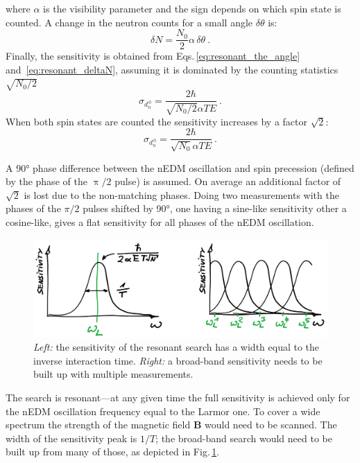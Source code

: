 where $\alpha$ is the visibility parameter and the sign depends on which spin state is counted.
A change in the neutron counts for a small angle $\delta \theta$ is:
\begin{equation}
  \delta N = \frac{N_0}{2} \alpha \, \delta \theta \ .
  \label{eq:resonant_deltaN}
\end{equation}
Finally, the sensitivity is obtained from Eqs.\,\ref{eq:resonant_the_angle} and~\ref{eq:resonant_deltaN}, assuming it is dominated by the counting statistics $\sqrt{N_0/2}$
\begin{equation}
  \sigma_{d_n^{\,0}} = \frac{2 \hbar}{\sqrt{N_0/2} \alpha T E} \ .
\end{equation}
When both spin states are counted the sensitivity increases by a factor $\sqrt{2}$:
\begin{equation}
  \sigma_{d_n^{\,0}} = \frac{2 \hbar}{\sqrt{N_0} \alpha T E} \ .
\end{equation}

A \ang{90} phase difference between the nEDM oscillation and spin precession (defined by the phase of the $\uppi/2$ pulse) is assumed.
On average an additional factor of $\sqrt{2}$ is lost due to the non-matching phases.
Doing two measurements with the phases of the $\pi/2$ pulses shifted by \ang{90}, one having a sine-like sensitivity other a cosine-like, gives a flat sensitivity for all phases of the nEDM oscillation.

\begin{figure}
  \centering
  \includegraphics[width=\linewidth]{gfx/axions/resonant_sensitivity.png}
  \caption{\emph{Left:} the sensitivity of the resonant search has a width equal to the inverse interaction time.
  \emph{Right:} a broad-band sensitivity needs to be built up with multiple measurements.}\label{fig:axions_resonant_sensitivity}
\end{figure}

The search is resonant---at any given time the full sensitivity is achieved only for the nEDM oscillation frequency equal to the Larmor one.
To cover a wide spectrum the strength of the magnetic field $\mathbf{B}$ would need to be scanned.
The width of the sensitivity peak is $1/T$; the broad-band search would need to be built up from many of those, as depicted in Fig.\,\ref{fig:axions_resonant_sensitivity}.

